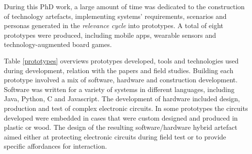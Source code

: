 During this PhD work, a large amount of time was dedicated to the
construction of technology artefacts, implementing systems'
requirements, scenarios and personas generated in the \emph{relevance
cycle} into prototypes. A total of eight prototypes were produced,
including mobile apps, wearable sensors and technology-augmented board
games.

Table \ref{prototypes} overviews prototypes developed, tools and
technologies used during development, relation with the papers and field
studies. Building each prototype involved a mix of software, hardware
and construction development. Software was written for a variety of
systems in different languages, including Java, Python, C and
Javascript. The development of hardware included design, production and
test of complex electronic circuits. In some prototypes the circuits
developed were embedded in cases that were custom designed and produced
in plastic or wood. The design of the resulting software/hardware hybrid
artefact aimed either at protecting electronic circuits during field
test or to provide specific affordances for interaction.

